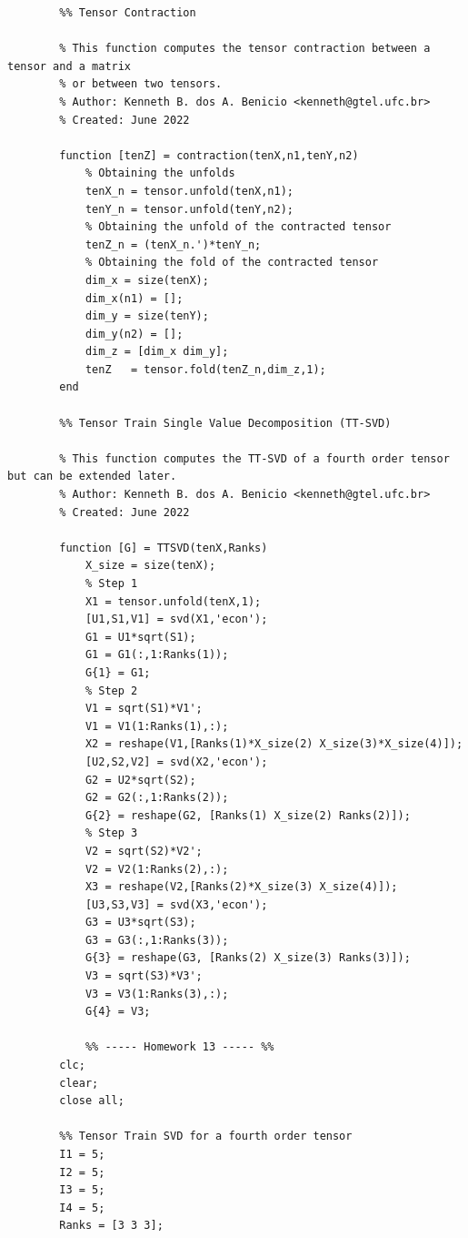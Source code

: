 \documentclass[a4paper,10pt]{article}
\begin{document}
    \begin{verbatim}
        %% Tensor Contraction

        % This function computes the tensor contraction between a tensor and a matrix
        % or between two tensors.   
        % Author: Kenneth B. dos A. Benicio <kenneth@gtel.ufc.br>
        % Created: June 2022

        function [tenZ] = contraction(tenX,n1,tenY,n2)
            % Obtaining the unfolds
            tenX_n = tensor.unfold(tenX,n1);
            tenY_n = tensor.unfold(tenY,n2);
            % Obtaining the unfold of the contracted tensor
            tenZ_n = (tenX_n.')*tenY_n;
            % Obtaining the fold of the contracted tensor
            dim_x = size(tenX);
            dim_x(n1) = [];
            dim_y = size(tenY);
            dim_y(n2) = [];
            dim_z = [dim_x dim_y];
            tenZ   = tensor.fold(tenZ_n,dim_z,1);
        end

        %% Tensor Train Single Value Decomposition (TT-SVD)

        % This function computes the TT-SVD of a fourth order tensor but can be extended later.   
        % Author: Kenneth B. dos A. Benicio <kenneth@gtel.ufc.br>
        % Created: June 2022

        function [G] = TTSVD(tenX,Ranks)
            X_size = size(tenX);
            % Step 1
            X1 = tensor.unfold(tenX,1);
            [U1,S1,V1] = svd(X1,'econ');
            G1 = U1*sqrt(S1);
            G1 = G1(:,1:Ranks(1));
            G{1} = G1;
            % Step 2
            V1 = sqrt(S1)*V1';
            V1 = V1(1:Ranks(1),:);
            X2 = reshape(V1,[Ranks(1)*X_size(2) X_size(3)*X_size(4)]);
            [U2,S2,V2] = svd(X2,'econ');
            G2 = U2*sqrt(S2);
            G2 = G2(:,1:Ranks(2));
            G{2} = reshape(G2, [Ranks(1) X_size(2) Ranks(2)]);
            % Step 3
            V2 = sqrt(S2)*V2';
            V2 = V2(1:Ranks(2),:);
            X3 = reshape(V2,[Ranks(2)*X_size(3) X_size(4)]);
            [U3,S3,V3] = svd(X3,'econ');
            G3 = U3*sqrt(S3);
            G3 = G3(:,1:Ranks(3));
            G{3} = reshape(G3, [Ranks(2) X_size(3) Ranks(3)]);
            V3 = sqrt(S3)*V3';
            V3 = V3(1:Ranks(3),:);
            G{4} = V3;

            %% ----- Homework 13 ----- %%
        clc;
        clear;
        close all;

        %% Tensor Train SVD for a fourth order tensor
        I1 = 5;
        I2 = 5;
        I3 = 5;
        I4 = 5;
        Ranks = [3 3 3];


\end{verbatim}
\end{document}
